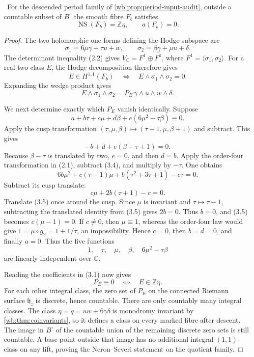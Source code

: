 \begin{proposition}
\label{wb:prop:very-general-torus-audit}
\ For the descended period family of
\cref{wb:prop:period-input-audit}, outside a countable subset of
\(B^\circ\) the smooth fibre
\(F_b\) satisfies
\[
 \operatorname{NS}(F_b)=\mathbb Z\eta,
 \qquad a(F_b)=0.
\tag{3.2}
\]
\end{proposition}

\begin{proof}
The two holomorphic one-forms defining the Hodge subspace are
\[
 \sigma_1=6\mu\gamma+\tau u+w,
 \qquad
 \sigma_2=\beta\gamma+\mu u+\delta.
\]
The determinant inequality (2.2) gives
\(V_{\mathbb C}=F^1\oplus\overline{F^1}\), where
\(F^1=\langle\sigma_1,\sigma_2\rangle\).  For a real two-class \(E\),
the Hodge decomposition therefore gives
\[
 E\in H^{1,1}(F_b)
 \quad\Longleftrightarrow\quad
 E\wedge\sigma_1\wedge\sigma_2=0.
\]
Expanding the wedge product gives
\[
 E\wedge\sigma_1\wedge\sigma_2
 =P_E\,\gamma\wedge u\wedge w\wedge\delta.
\tag{3.3}
\]

We next determine exactly which \(P_E\) vanish identically.  Suppose
\[
 a+b\tau+c\mu+d\beta+e(6\mu^2-\tau\beta)\equiv0.
\tag{3.4}
\]
Apply the cusp transformation
\((\tau,\mu,\beta)\mapsto(\tau-1,\mu,\beta+1)\) and subtract.  This gives
\[
 -b+d+e(\beta-\tau+1)=0.
\]
Because \(\beta-\tau\) is translated by two, \(e=0\), and then \(d=b\).
Apply the order-four transformation in (2.1), subtract (3.4), and multiply
by \(-\tau\).  One obtains
\[
 6b\mu^2+c(\tau-1)\mu+b(\tau^2+3\tau+1)-c\tau=0.
\]
Subtract its cusp translate:
\[
 c\mu+2b(\tau+1)-c=0.
\tag{3.5}
\]
Translate (3.5) once around the cusp.  Since \(\mu\) is invariant and
\(\tau\mapsto\tau-1\), subtracting the translated identity from (3.5)
gives \(2b=0\).  Thus \(b=0\), and (3.5) becomes
\(c(\mu-1)=0\).  If \(c\ne0\), then \(\mu\equiv1\), whereas the
order-four law would give
\(1=\mu\circ g_2=1+1/\tau\), an impossibility.  Hence \(c=0\), then
\(b=d=0\), and finally \(a=0\).
Thus the five functions
\[
 1,\quad\tau,\quad\mu,\quad\beta,\quad6\mu^2-\tau\beta
\]
are linearly independent over \(\mathbb C\).

Reading the coefficients in (3.1) now gives
\[
 P_E\equiv0\quad\Longleftrightarrow\quad E\in\mathbb Z\eta.
\tag{3.6}
\]
For each other integral class, the zero set of \(P_E\) on the connected
Riemann surface \(\mathfrak h_z\) is discrete, hence countable.  There are
only countably many integral classes.  The class
\(\eta=q=uw+6\gamma\delta\) is monodromy invariant by
\cref{wb:thm:coinvariants}, so it defines a class on every marked fibre after
descent.  The image in \(B^\circ\) of the countable union of the remaining
discrete zero sets is still countable.  A base point outside that image has
no additional integral \((1,1)\)-class on any lift, proving the
Neron--Severi statement on the quotient family.


\end{proof}
